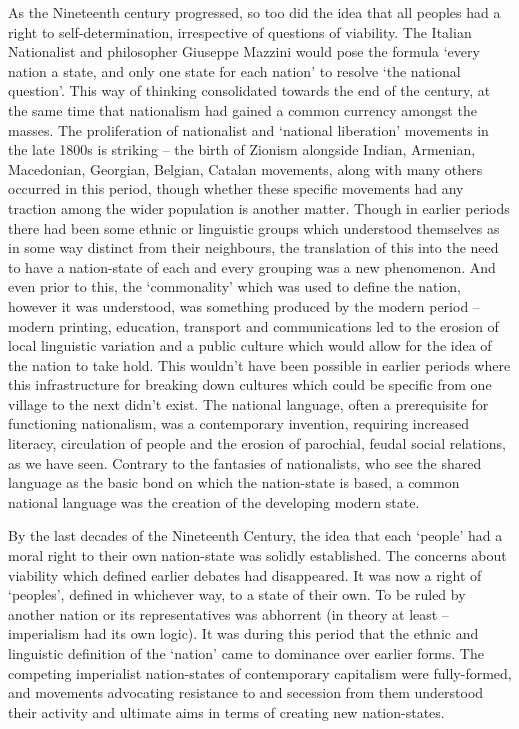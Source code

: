 As the Nineteenth century progressed, so too did the idea that all peoples had a right to self-determination, irrespective of questions of viability. The Italian Nationalist and philosopher Giuseppe Mazzini would pose the formula ‘every nation a state, and only one state for each nation’ to resolve ‘the national question’. This way of thinking consolidated towards the end of the century, at the same time that nationalism had gained a common currency amongst the masses. The proliferation of nationalist and ‘national liberation’ movements in the late 1800s is striking – the birth of Zionism alongside Indian, Armenian, Macedonian, Georgian, Belgian, Catalan movements, along with many others occurred in this period, though whether these specific movements had any traction among the wider population is another matter. Though in earlier periods there had been some ethnic or linguistic groups which understood themselves as in some way distinct from their neighbours, the translation of this into the need to have a nation-state of each and every grouping was a new phenomenon. And even prior to this, the ‘commonality’ which was used to define the nation, however it was understood, was something produced by the modern period – modern printing, education, transport and communications led to the erosion of local linguistic variation and a public culture which would allow for the idea of the nation to take hold. This wouldn’t have been possible in earlier periods where this infrastructure for breaking down cultures which could be specific from one village to the next didn’t exist. The national language, often a prerequisite for functioning nationalism, was a contemporary invention, requiring increased literacy, circulation of people and the erosion of parochial, feudal social relations, as we have seen. Contrary to the fantasies of nationalists, who see the shared language as the basic bond on which the nation-state is based, a common national language was the creation of the developing modern state.

By the last decades of the Nineteenth Century, the idea that each ‘people’ had a moral right to their own nation-state was solidly established. The concerns about viability which defined earlier debates had disappeared. It was now a right of ‘peoples’, defined in whichever way, to a state of their own. To be ruled by another nation or its representatives was abhorrent (in theory at least – imperialism had its own logic). It was during this period that the ethnic and linguistic definition of the ‘nation’ came to dominance over earlier forms. The competing imperialist nation-states of contemporary capitalism were fully-formed, and movements advocating resistance to and secession from them understood their activity and ultimate aims in terms of creating new nation-states.


